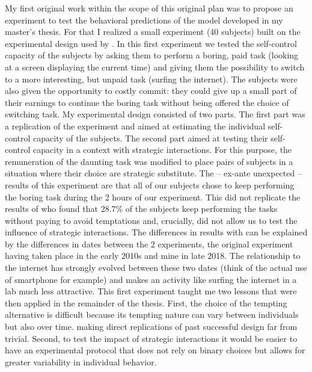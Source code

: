\documentclass[
]{book}
\begin{document}
My first original work within the scope of this original plan was to propose an experiment to test the
behavioral predictions of the model developed in my master's thesis.
For that I realized a small experiment (40 subjects) built on the experimental design used by \citet{houser2018temptation}.
In this first experiment we tested the self-control capacity of the subjects by asking
them to perform a boring, paid task (looking at a screen displaying the current time) and giving them the possibility to switch to a more interesting, but unpaid task (surfing the
internet).
The subjects were also given the opportunity to costly commit: they could give up a small part of their earnings to continue the boring task without being offered the choice of switching task.
My experimental design consisted of two parts.
The first part was a replication of the \citet{houser2018temptation} experiment and aimed at estimating the individual self-control capacity of the subjects.
The second part aimed at testing their self-control capacity in a context with strategic interactions.
For this purpose, the remuneration of the daunting task was modified to place
pairs of subjects in a situation where their choice are strategic substitute.
The -- ex-ante unexpected -- results of this experiment are that all of our subjects chose to keep performing the
boring task during the 2 hours of our experiment.
This did not replicate the results of \citet{houser2018temptation} who found that
28.7\% of the subjects keep performing the tasks without paying to avoid
temptations and, crucially, did not allow us to test the influence of strategic
interactions.
The differences in results with \citet{houser2018temptation} can be explained by the
differences in dates between the 2 experiments, the original experiment having
taken place in the early 2010s and mine in late 2018.
The relationship to the internet has strongly evolved between these two dates
(think of the actual use of smartphone for example)
and makes an activity like surfing the internet in a lab much less attractive.
This first experiment taught me two lessons that were then applied in the
remainder of the thesis.
First, the choice of the
tempting alternative is difficult because its tempting nature can vary between
individuals but also over time.
making direct replications of past successful design far from trivial.
Second, to test the impact of strategic interactions it would be easier to have
an experimental protocol that does not rely on binary choices but allows for
greater variability in individual behavior.
\end{document}
